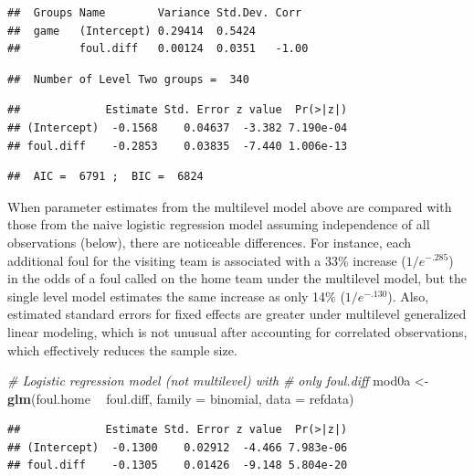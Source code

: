 \documentclass[
]{krantz}
\newenvironment{Shaded}{\begin{snugshade}}{\end{snugshade}}
\newcommand{\CommentTok}[1]{\textcolor[rgb]{0.37,0.37,0.37}{\textit{#1}}}
\newcommand{\DataTypeTok}[1]{\textcolor[rgb]{0.27,0.27,0.27}{#1}}
\newcommand{\KeywordTok}[1]{\textcolor[rgb]{0.27,0.27,0.27}{\textbf{#1}}}
\newcommand{\NormalTok}[1]{#1}
\newcommand{\OperatorTok}[1]{\textcolor[rgb]{0.43,0.43,0.43}{\textbf{#1}}}
\newcommand{\StringTok}[1]{\textcolor[rgb]{0.5,0.5,0.5}{#1}}
\begin{document}
\begin{verbatim}
##  Groups Name        Variance Std.Dev. Corr 
##  game   (Intercept) 0.29414  0.5424        
##         foul.diff   0.00124  0.0351   -1.00
\end{verbatim}

\begin{verbatim}
##  Number of Level Two groups =  340
\end{verbatim}

\begin{verbatim}
##             Estimate Std. Error z value  Pr(>|z|)
## (Intercept)  -0.1568    0.04637  -3.382 7.190e-04
## foul.diff    -0.2853    0.03835  -7.440 1.006e-13
\end{verbatim}

\begin{verbatim}
##  AIC =  6791 ;  BIC =  6824
\end{verbatim}

When parameter estimates from the multilevel model above are compared with those from the naive logistic regression model assuming independence of all observations (below), there are noticeable differences. For instance, each additional foul for the visiting team is associated with a 33\% increase (\(1/e^{-.285}\)) in the odds of a foul called on the home team under the multilevel model, but the single level model estimates the same increase as only 14\% (\(1/e^{-.130}\)). Also, estimated standard errors for fixed effects are greater under multilevel generalized linear modeling, which is not unusual after accounting for correlated observations, which effectively reduces the sample size.

\begin{Shaded}
\begin{Highlighting}[]
\CommentTok{# Logistic regression model (not multilevel) with }
\CommentTok{#   only foul.diff}
\NormalTok{mod0a <-}\StringTok{ }\KeywordTok{glm}\NormalTok{(foul.home }\OperatorTok{~}\StringTok{ }\NormalTok{foul.diff, }\DataTypeTok{family =}\NormalTok{ binomial, }
             \DataTypeTok{data =}\NormalTok{ refdata)}
\end{Highlighting}
\end{Shaded}

\begin{verbatim}
##             Estimate Std. Error z value  Pr(>|z|)
## (Intercept)  -0.1300    0.02912  -4.466 7.983e-06
## foul.diff    -0.1305    0.01426  -9.148 5.804e-20
\end{verbatim}
\end{document}
